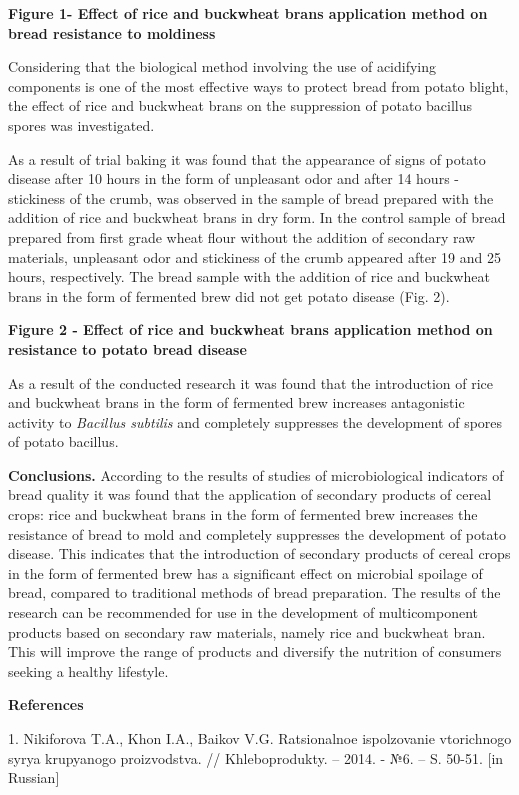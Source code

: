 {\bfseries Figure 1- Effect of rice and buckwheat brans application method
on bread resistance to moldiness}

Considering that the biological method involving the use of acidifying
components is one of the most effective ways to protect bread from
potato blight, the effect of rice and buckwheat brans on the suppression
of potato bacillus spores was investigated.

As a result of trial baking it was found that the appearance of signs of
potato disease after 10 hours in the form of unpleasant odor and after
14 hours - stickiness of the crumb, was observed in the sample of bread
prepared with the addition of rice and buckwheat brans in dry form. In
the control sample of bread prepared from first grade wheat flour
without the addition of secondary raw materials, unpleasant odor and
stickiness of the crumb appeared after 19 and 25 hours, respectively.
The bread sample with the addition of rice and buckwheat brans in the
form of fermented brew did not get potato disease (Fig. 2).

{\bfseries Figure 2 - Effect of rice and buckwheat brans application method
on resistance to potato bread disease}

As a result of the conducted research it was found that the introduction
of rice and buckwheat brans in the form of fermented brew increases
antagonistic activity to \emph{Bacillus subtilis} and completely
suppresses the development of spores of potato bacillus.

{\bfseries Conclusions.} According to the results of studies of
microbiological indicators of bread quality it was found that the
application of secondary products of cereal crops: rice and buckwheat
brans in the form of fermented brew increases the resistance of bread to
mold and completely suppresses the development of potato disease. This
indicates that the introduction of secondary products of cereal crops in
the form of fermented brew has a significant effect on microbial
spoilage of bread, compared to traditional methods of bread preparation.
The results of the research can be recommended for use in the
development of multicomponent products based on secondary raw materials,
namely rice and buckwheat bran. This will improve the range of products
and diversify the nutrition of consumers seeking a healthy lifestyle.

{\bfseries References}

1. Nikiforova T.A., Khon I.A., Baikov V.G. Ratsional\textquotesingle noe
ispol\textquotesingle zovanie vtorichnogo syr\textquotesingle ya
krupyanogo proizvodstva. // Khleboprodukty. -- 2014. - №6. -- S. 50-51.
{[}in Russian{]}


